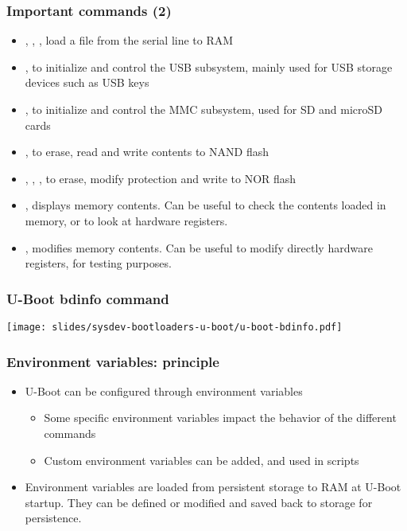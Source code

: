 \begin{frame}
  \frametitle{Important commands (2)}
  \begin{itemize}
  \item {}, , , load a file from the
    serial line to RAM
  \item {}, to initialize and control the USB subsystem,
    mainly used for USB storage devices such as USB keys
  \item {}, to initialize and control the MMC subsystem, used
    for SD and microSD cards
  \item {}, to erase, read and write contents to NAND flash
  \item {}, , , to erase, modify
    protection and write to NOR flash
  \item {}, displays memory contents. Can be useful to check the
    contents loaded in memory, or to look at hardware registers.
  \item {}, modifies memory contents. Can be useful to modify
    directly hardware registers, for testing purposes.
\end{itemize}
\end{frame}

\begin{frame}
  \frametitle{U-Boot bdinfo command}
  \texttt{[image: slides/sysdev-bootloaders-u-boot/u-boot-bdinfo.pdf]}
\end{frame}

\begin{frame}
  \frametitle{Environment variables: principle}
  \begin{itemize}
  \item U-Boot can be configured through environment variables
    \begin{itemize}
    \item Some specific environment variables impact the behavior of
      the different commands
    \item Custom environment variables can be added, and used in
      scripts
    \end{itemize}
  \item Environment variables are loaded from persistent storage to RAM at U-Boot
    startup. They can be defined or modified and saved back to storage
    for persistence.
  \end{itemize}
\end{frame}

